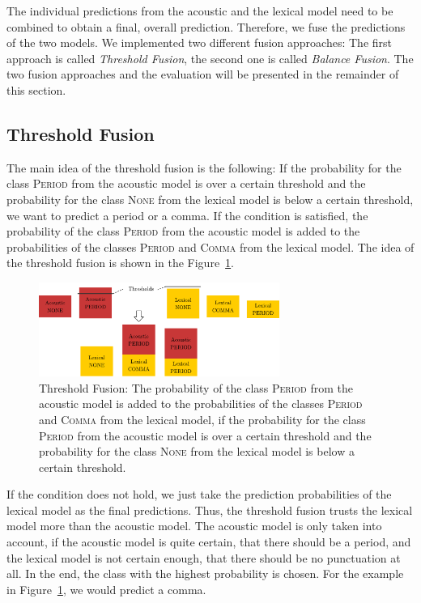 The individual predictions from the acoustic and the lexical model need to be combined to obtain a final, overall prediction.
Therefore, we fuse the predictions of the two models.
We implemented two different fusion approaches:
The first approach is called \emph{Threshold Fusion}, the second one is called \emph{Balance Fusion}.
The two fusion approaches and the evaluation will be presented in the remainder of this section.

\subsection{Threshold Fusion}
The main idea of the threshold fusion is the following: If the probability for the class \textsc{Period} from the acoustic model is over a certain threshold and the probability for the class \textsc{None} from the lexical model is below a certain threshold, we want to predict a period or a comma.
If the condition is satisfied, the probability of the class \textsc{Period} from the acoustic model is added to the probabilities of the classes \textsc{Period} and \textsc{Comma} from the lexical model.
The idea of the threshold fusion is shown in the Figure~\ref{fig:fusion_1}.
\begin{figure}[ht]
    \centering
    \includegraphics[width=0.7\textwidth]{img/fusion_1.pdf}
    \caption{Threshold Fusion: The probability of the class \textsc{Period} from the acoustic model is added to the probabilities of the classes \textsc{Period} and \textsc{Comma} from the lexical model, if the probability for the class \textsc{Period} from the acoustic model is over a certain threshold and the probability for the class \textsc{None} from the lexical model is below a certain threshold.}
    \label{fig:fusion_1}
\end{figure}
If the condition does not hold, we just take the prediction probabilities of the lexical model as the final predictions.
Thus, the threshold fusion trusts the lexical model more than the acoustic model.
The acoustic model is only taken into account, if the acoustic model is quite certain, that there should be a period, and the lexical model is not certain enough, that there should be no punctuation at all.
In the end, the class with the highest probability is chosen.
For the example in Figure~\ref{fig:fusion_1}, we would predict a comma.

